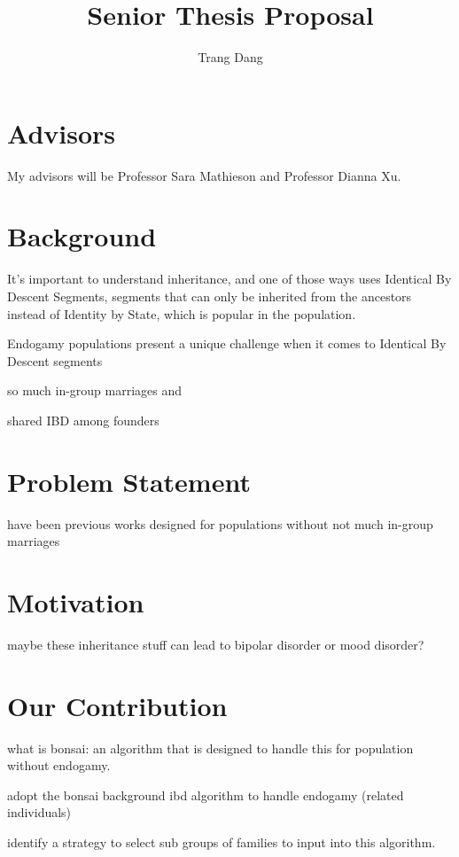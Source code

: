 \documentclass[12pt]{article}
\title{Senior Thesis Proposal}
\author{Trang Dang}
\makeatletter
\let\inserttitle\@title
\let\insertauthor\@author
\makeatother
\begin{document}
\begin{center}
  \LARGE{\inserttitle}

  \Large{\insertauthor}
\end{center}

\section*{Advisors}

My advisors will be Professor Sara Mathieson and Professor Dianna Xu.

\section*{Background}

It's important to understand inheritance, and one of those ways uses Identical By Descent Segments, segments that can only be inherited from the ancestors instead of Identity by State, which is popular in the population. 

Endogamy populations present a unique challenge when it comes to Identical By Descent segments

so much in-group marriages and 

shared IBD among founders

\section*{Problem Statement}

have been previous works designed for populations without not much in-group marriages

\section*{Motivation} 

maybe these inheritance stuff can lead to bipolar disorder or mood disorder?

\section*{Our Contribution}

what is bonsai: an algorithm that is designed to handle this for population without endogamy.

adopt the bonsai background ibd algorithm to handle endogamy (related individuals)

identify a strategy to select sub groups of families to input into this algorithm.
\end{document}
